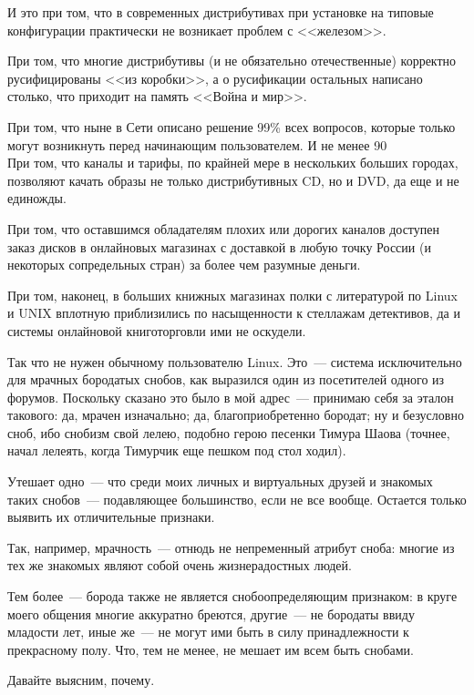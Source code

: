 И это при том, что в современных дистрибутивах при установке на типовые конфигурации практически не возникает проблем с <<железом>>.

При том, что многие дистрибутивы (и не обязательно отечественные) корректно русифицированы <<из коробки>>, а о русификации остальных написано столько, что приходит на память <<Война и мир>>.

При том, что ныне в Сети описано решение 99\% всех вопросов, которые только могут возникнуть перед начинающим пользователем. И не менее 90\\%

При том, что каналы и тарифы, по крайней мере в нескольких больших городах, позволяют качать образы не только дистрибутивных CD, но и DVD, да еще и не единожды.

При том, что оставшимся обладателям плохих или дорогих каналов доступен заказ дисков в онлайновых магазинах с доставкой в любую точку России (и некоторых сопредельных стран) за более чем разумные деньги.

При том, наконец, в больших книжных магазинах полки с литературой по Linux и UNIX вплотную приблизились по насыщенности к стеллажам детективов, да и системы онлайновой книготорговли ими не оскудели.

Так что не нужен обычному пользователю Linux. Это~--- система исключительно для мрачных бородатых снобов, как выразился один из посетителей одного из форумов. Поскольку сказано это было в мой адрес~--- принимаю себя за эталон такового: да, мрачен изначально; да, благоприобретенно бородат; ну и безусловно сноб, ибо снобизм свой лелею, подобно герою песенки Тимура Шаова (точнее, начал лелеять, когда Тимурчик еще пешком под стол ходил).

Утешает одно~--- что среди моих личных и виртуальных друзей и знакомых таких снобов~--- подавляющее большинство, если не все вообще. Остается только выявить их отличительные признаки.

Так, например, мрачность~--- отнюдь не непременный атрибут сноба: многие из тех же знакомых являют собой очень жизнерадостных людей.

Тем более~--- борода также не является снобоопределяющим признаком: в круге моего общения многие аккуратно бреются, другие~--- не бородаты ввиду младости лет, иные же~--- не могут ими быть в силу принадлежности к прекрасному полу. Что, тем не менее, не мешает им всем быть снобами.

Давайте выясним, почему.

